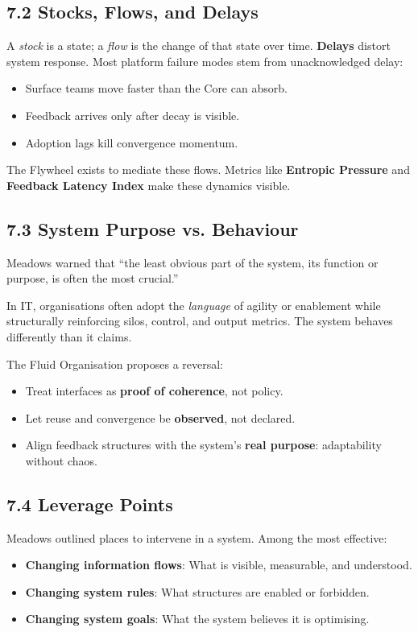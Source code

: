 \documentclass[12pt]{article}
\begin{document}
\subsection*{7.2 Stocks, Flows, and Delays}

A \textit{stock} is a state; a \textit{flow} is the change of that state over time. \textbf{Delays} distort system response. Most platform failure modes stem from unacknowledged delay:
\begin{itemize}
    \item Surface teams move faster than the Core can absorb.
    \item Feedback arrives only after decay is visible.
    \item Adoption lags kill convergence momentum.
\end{itemize}

The Flywheel exists to mediate these flows. Metrics like \textbf{Entropic Pressure} and \textbf{Feedback Latency Index} make these dynamics visible.

\subsection*{7.3 System Purpose vs. Behaviour}

Meadows warned that “the least obvious part of the system, its function or purpose, is often the most crucial.”

In IT, organisations often adopt the \textit{language} of agility or enablement while structurally reinforcing silos, control, and output metrics. The system behaves differently than it claims.

The Fluid Organisation proposes a reversal:
\begin{itemize}
    \item Treat interfaces as \textbf{proof of coherence}, not policy.
    \item Let reuse and convergence be \textbf{observed}, not declared.
    \item Align feedback structures with the system’s \textbf{real purpose}: adaptability without chaos.
\end{itemize}

\subsection*{7.4 Leverage Points}

Meadows outlined places to intervene in a system. Among the most effective:
\begin{itemize}
    \item \textbf{Changing information flows}: What is visible, measurable, and understood.
    \item \textbf{Changing system rules}: What structures are enabled or forbidden.
    \item \textbf{Changing system goals}: What the system believes it is optimising.
\end{itemize}
\end{document}
